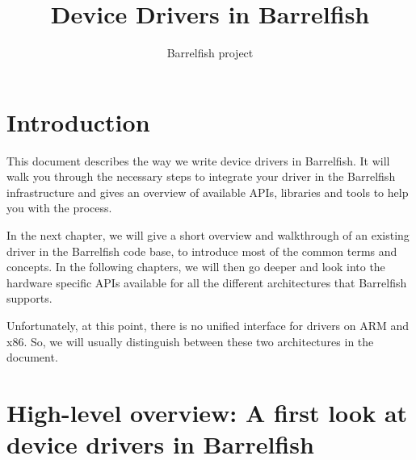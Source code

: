\documentclass[a4paper,11pt,twoside]{report}
\title{Device Drivers in Barrelfish}
\author{Barrelfish project}
\begin{document}
\maketitle			%

\begin{versionhistory}
\end{versionhistory}

\tableofcontents		%
\cleardoublepage
\setcounter{secnumdepth}{2}

\newcommand{\fnname}[1]{\textit{\texttt{#1}}}%
\newcommand{\datatype}[1]{\textit{\texttt{#1}}}%
\newcommand{\varname}[1]{\texttt{#1}}%
\newcommand{\keywname}[1]{\textbf{\texttt{#1}}}%
\newcommand{\pathname}[1]{\texttt{#1}}%
\newcommand{\tabindent}{\hspace*{3ex}}%


\chapter{Introduction}
\label{chap:introduction}

This document describes the way we write device drivers in Barrelfish. It will
walk you through the necessary steps to integrate your driver in the
Barrelfish infrastructure and gives an overview of available APIs,
libraries and tools to help you with the process.

In the next chapter, we will give a short overview and walkthrough of an
existing driver in the Barrelfish code base, to introduce most of the common
terms and concepts. In the following chapters, we will then go deeper and look
into the hardware specific APIs available for all the different architectures
that Barrelfish supports.

Unfortunately, at this point, there is no unified interface for drivers on ARM
and x86. So, we will usually distinguish between these two architectures in
the document.

\chapter{High-level overview: A first look at device drivers in Barrelfish}
\label{chap:overview}
\end{document}
